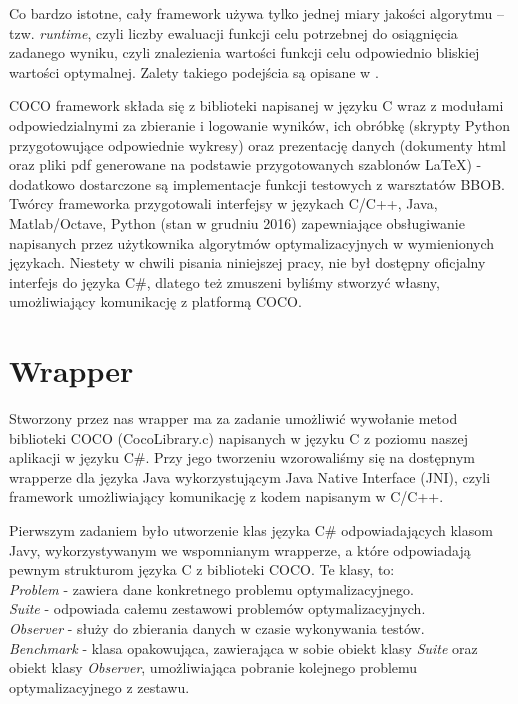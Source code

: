 \documentclass[12pt, twoside, openany, abstract=on]{report}
\theoremstyle{definition}
\begin{document}
Co bardzo istotne, cały framework używa tylko jednej miary jakości algorytmu – tzw. \textit{runtime}, czyli liczby ewaluacji funkcji celu potrzebnej do osiągnięcia zadanego wyniku, czyli znalezienia wartości funkcji celu odpowiednio bliskiej wartości optymalnej. Zalety takiego podejścia są opisane w \cite{CocoPlatform}.

COCO framework składa się z biblioteki napisanej w języku C wraz z modułami odpowiedzialnymi za zbieranie i logowanie wyników, ich obróbkę (skrypty Python przygotowujące odpowiednie wykresy) oraz prezentację danych (dokumenty html oraz pliki pdf generowane na podstawie przygotowanych szablonów LaTeX) - dodatkowo dostarczone są implementacje funkcji testowych z warsztatów BBOB. Twórcy frameworka przygotowali interfejsy w językach C/C++, Java, Matlab/Octave, Python (stan w grudniu 2016) zapewniające obsługiwanie napisanych przez użytkownika algorytmów optymalizacyjnych w wymienionych językach. Niestety w chwili pisania niniejszej pracy, nie był dostępny oficjalny interfejs do języka C\#, dlatego też zmuszeni byliśmy stworzyć własny, umożliwiający komunikację z platformą COCO.

\section{Wrapper}

Stworzony przez nas wrapper ma za zadanie umożliwić wywołanie metod biblioteki COCO (CocoLibrary.c) napisanych w języku C z poziomu naszej aplikacji w języku C\#. Przy jego tworzeniu wzorowaliśmy się na dostępnym wrapperze dla języka Java wykorzystującym Java Native Interface (JNI), czyli framework umożliwiający komunikację z kodem napisanym w C/C++. 

Pierwszym zadaniem było utworzenie klas języka C\# odpowiadających klasom Javy, wykorzystywanym we wspomnianym wrapperze, a które odpowiadają pewnym strukturom języka C z biblioteki COCO. Te klasy, to:\\

\textit{Problem} - zawiera dane konkretnego problemu optymalizacyjnego.\\
\textit{Suite} - odpowiada całemu zestawowi problemów optymalizacyjnych.\\
\textit{Observer} - służy do zbierania danych w czasie wykonywania testów.\\
\textit{Benchmark} - klasa opakowująca, zawierająca w sobie obiekt klasy \textit{Suite} oraz obiekt klasy \textit{Observer}, umożliwiająca pobranie kolejnego problemu optymalizacyjnego z zestawu.\\
\end{document}
